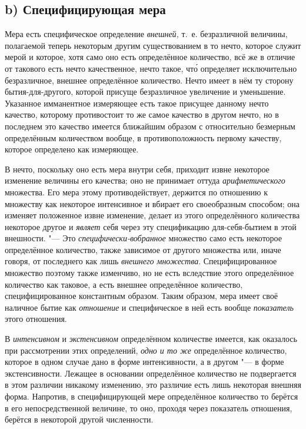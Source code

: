 \subsection[b) Специфицирующая мера]{b) Специфицирующая мера}

Мера есть специфическое определение {\em внешней,} т.~е. безразличной величины,
полагаемой теперь некоторым другим существованием в то нечто, которое служит
мерой и которое, хотя само оно есть определённое количество, всё же в отличие
от такового есть нечто качественное, нечто такое, чт\'{о} определяет
исключительно безразличное, внешнее определённое количество. Нечто имеет в нём
ту сторону бытия-для-другого, которой присуще безразличное увеличение и
уменьшение. Указанное имманентное измеряющее есть такое присущее данному нечто
качество, которому противостоит то же самое качество в другом нечто, но в
последнем это качество имеется ближайшим образом с относительно безмерным
определённым количеством вообще, в противоположность первому качеству, которое
определено как измеряющее.

В нечто, поскольку оно есть мера внутри себя, приходит извне некоторое
изменение величины его качества; оно не принимает оттуда {\em арифметического}
множества. Его мера этому противодействует, держится по отношению к множеству
как некоторое интенсивное и вбирает его своеобразным способом; она изменяет
положенное извне изменение, делает из этого определённого количества некоторое
другое и {\em являет} себя через эту спецификацию для-себя-бытием в этой
внешности. "--- Это {\em специфически-вобранное} множество само есть некоторое
определённое количество, также зависимое от другого множества или, иначе
говоря, от последнего как лишь {\em внешнего множества}. Специфицированное
множество поэтому также изменчиво, но не есть вследствие этого определённое
количество как таковое, а есть внешнее определённое количество,
специфицированное константным образом. Таким образом, мера имеет своё наличное
бытие как {\em отношение} и специфическое в ней есть вообще {\em показатель}
этого отношения.

В {\em интенсивном} и {\em экстенсивном} определённом количестве имеется, как
оказалось при рассмотрении этих определений, {\em одно и то же} определённое
количество, которое в одном случае дано в форме интенсивности, а в другом "---
в форме экстенсивности. Лежащее в основании определённое количество не
подвергается в этом различии никакому изменению, это различие есть лишь
некоторая внешняя форма. Напротив, в специфицирующей мере определённое
количество то берётся в его непосредственной величине, то оно, проходя через
показатель отношения, берётся в некоторой другой численности.

